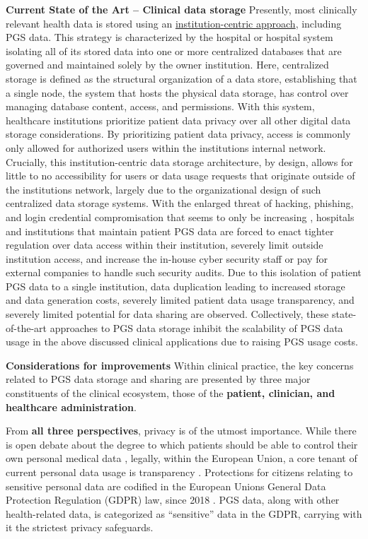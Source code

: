 \documentclass[a4paper,11pt]{article}
\begin{document}
\textbf{Current State of the Art -- Clinical data storage}
Presently, most clinically relevant health data is stored using an \underline{institution-centric approach}, including PGS data. 
This strategy is characterized by the hospital or hospital system isolating all of its stored data into one or more centralized databases that are governed and maintained solely by the owner institution. 
Here, centralized storage is defined as the structural organization of a data store, establishing that a single node, the system that hosts the physical data storage, has control over managing database content, access, and permissions. 
With this system, healthcare institutions prioritize patient data privacy over all other digital data storage considerations. 
By prioritizing patient data privacy, access is commonly only allowed for authorized users within the institution\textquotesingle s internal network. 
Crucially, this institution-centric data storage architecture, by design, allows for little to no accessibility for users or data usage requests that originate outside of the institution\textquotesingle s network, largely due to the organizational design of such centralized data storage systems. 
With the enlarged threat of hacking, phishing, and login credential compromisation that seems to only be increasing \cite{noauthor_ransomware_nodate}, hospitals and institutions that maintain patient PGS data are forced to enact tighter regulation over data access within their institution, severely limit outside institution access, and increase the in-house cyber security staff or pay for external companies to handle such security audits.  
Due to this isolation of patient PGS data to a single institution, data duplication leading to increased storage and data generation costs, severely limited patient data usage transparency, and severely limited potential for data sharing are observed. 
Collectively, these state-of-the-art approaches to PGS data storage inhibit the scalability of PGS data usage in the above discussed clinical applications due to raising PGS usage costs.


\textbf{Considerations for improvements}
Within clinical practice, the key concerns related to PGS data storage and sharing are presented by three major constituents of the clinical ecosystem, those of the \textbf{patient, clinician, and healthcare administration}. 

From \textbf{all three perspectives}, privacy is of the utmost importance. 
While there is open debate about the degree to which patients should be able to control their own personal medical data \cite{blumenthal_giving_2015,damen_patients_2022}, legally, within the European Union, a core tenant of current personal data usage is transparency \cite{spagnuelo_qualifying_2020}. 
Protections for citizens relating to sensitive personal data are codified in the European Union\textquotesingle s General Data Protection Regulation (GDPR) law, since 2018 \cite{noauthor_regulation_2016}. 
PGS data, along with other health-related data, is categorized as “sensitive” data in the GDPR, carrying with it the strictest privacy safeguards. 
\end{document}

